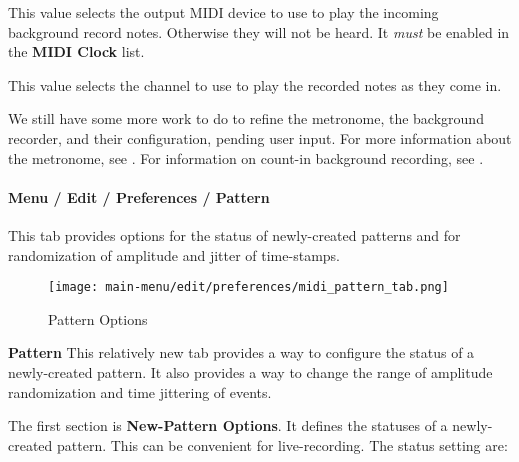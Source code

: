    This value selects the output MIDI device to use to play the incoming
   background record notes.  Otherwise they will not be heard.
   It \textsl{must} be enabled in the \textbf{MIDI Clock} list.

   This value selects the channel to use to play the recorded notes as
   they come in.

   We still have some more work to do to refine the metronome, the
   background recorder, and their configuration, pending user input.
   For more information about the metronome, see
   .
   For information on count-in background recording, see
   .

\paragraph{Menu / Edit / Preferences / Pattern}
\label{paragraph:menu_edit_preferences_pattern}

   This tab provides options for the status of newly-created patterns
   and for randomization of amplitude and jitter of time-stamps.

\begin{figure}[H]
   \centering 
   \texttt{[image: main-menu/edit/preferences/midi\_pattern\_tab.png]}
   \caption{Pattern Options}
   \label{fig:midi_pattern_options_tab}
\end{figure}

   \textbf{Pattern}
   This relatively new tab provides a way to configure the status of
   a newly-created pattern.
   It also provides a way to change the range of amplitude randomization
   and time jittering of events.

   The first section is \textbf{New-Pattern Options}.
   It defines the statuses of a newly-created pattern.
   This can be convenient for live-recording.
   The status setting are:


